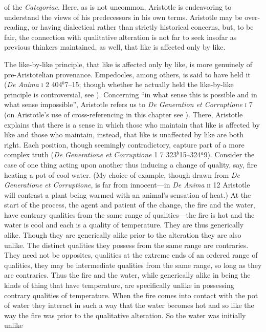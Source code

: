 of the \emph{Categoriae}. Here, as is not uncommon, Aristotle is endeavoring to understand the views of his predecessors in his own terms. Aristotle may be over-reading, or having dialectical rather than strictly historical concerns, but, to be fair, the connection with qualitative alteration is not far to seek insofar as previous thinkers maintained, as well, that like is affected only by like.

The like-by-like principle, that like is affected only by like, is more genuinely of pre-Aristotelian provenance. Empedocles, among others, is said to have held it (\emph{De Anima} \textsc{i} 2 404\( ^{b} \)7--15; though whether he actually held the like-by-like principle is controversial, see \citealt{Kamtekar:2009fk}). Concerning ``in what sense this is possible and in what sense impossible'', Aristotle refers us to \emph{De Generation et Corruptione} \textsc{i} 7 (on Aristotle's use of cross-referencing in this chapter see \citealt{Burnyeat:2002an}). There, Aristotle explains that there is a sense in which those who maintain that like is affected by like and those who maintain, instead, that like is unaffected by like are both right. Each position, though seemingly contradictory, capture part of a more complex truth (\emph{De Generatione et Corruptione} \textsc{1} 7 323\( ^{b} \)15--324\( ^{a} \)9). Consider the case of one thing acting upon another thus inducing a change of quality, say, fire heating a pot of cool water. (My choice of example, though drawn from \emph{De Generatione et Corruptione}, is far from innocent---in \emph{De Anima} \textsc{ii} 12 Aristotle will contrast a plant being warmed with an animal's sensation of heat.) At the start of the process, the agent and patient of the change, the fire and the water, have contrary qualities from the same range of qualities---the fire is hot and the water is cool and each is a quality of temperature. They are thus generically alike. Though they are generically alike prior to the alteration they are also unlike. The distinct qualities they possess from the same range are contraries. They need not be opposites, qualities at the extreme ends of an ordered range of qualities, they may be intermediate qualities from the same range, so long as they are contraries. Thus the fire and the water, while generically alike in being the kinds of thing that have temperature, are specifically unlike in possessing contrary qualities of temperature. When the fire comes into contact with the pot of water they interact in such a way that the water becomes hot and so like the way the fire was prior to the qualitative alteration. So the water was initially unlike 